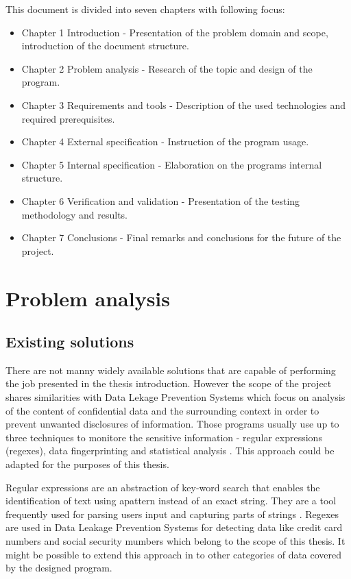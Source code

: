 \documentclass[a4paper,twoside,12pt]{book}
\begin{document}
This document is divided into seven chapters with following focus:

\begin{itemize}
   \item Chapter 1 Introduction - Presentation of the problem domain and scope, introduction of the document structure.
   \item Chapter 2 Problem analysis - Research of the topic and design of the program.
   \item Chapter 3 Requirements and tools - Description of the used technologies and required prerequisites.
   \item Chapter 4 External specification - Instruction of the program usage.
   \item Chapter 5 Internal specification - Elaboration on the programs internal structure.
   \item Chapter 6 Verification and validation - Presentation of the testing methodology and results.
   \item Chapter 7 Conclusions - Final remarks and conclusions for the future of the project.
   \end{itemize}

\chapter{Problem analysis}

\section{Existing solutions}

There are not manny widely available solutions that are capable of performing the job presented in the thesis introduction. However the scope of the project shares
similarities with Data Lekage Prevention Systems which focus on analysis of the content of confidential data and the surrounding context in order to
prevent unwanted disclosures of information. Those programs usually use up to three techniques to monitore the sensitive information - regular expressions (regexes),
data fingerprinting and statistical analysis \cite{bib:articleDLPS}. This approach could be adapted for the purposes of this thesis. 

Regular expressions are an abstraction of key-word search that enables the identification of text using apattern instead of an exact string. They are a tool 
frequently used for parsing users input and capturing parts of strings \cite{bib:conferenceRegex}. Regexes are used in Data Leakage Prevention Systems for detecting 
data like credit card numbers and social security mumbers \cite{bib:articleDLPS} which belong to the scope of this thesis. It might be possible to extend this approach 
in to other categories of data covered by the designed program.
\end{document}

